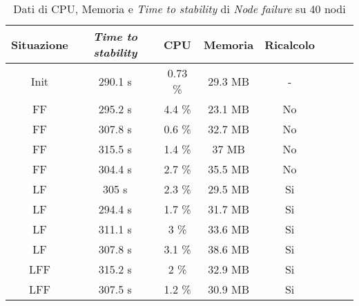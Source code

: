     \begin{table}[H]
    \caption{Dati di CPU, Memoria e \textit{Time to stability} di \textit{Node failure} su 40 nodi}
    \label{tab:NF40}
    \begin{center}
        \begin{tabular}{|c|c|c|c|c|c|c|c|}
            \hline
            Situazione & \textit{Time to stability} & CPU & Memoria & Ricalcolo\\
            \hline
            Init & 290.1 s & 0.73 \% & 29.3 MB & -\\
            FF    & 295.2 s  & 4.4 \%  & 23.1 MB & No\\
            FF    & 307.8 s  & 0.6 \%  & 32.7 MB & No\\
            FF    & 315.5 s  & 1.4 \%  & 37   MB & No\\
            FF    & 304.4 s  & 2.7 \%  & 35.5 MB & No\\
            LF    & 305 s    & 2.3 \%  & 29.5 MB & Si\\
            LF    & 294.4 s  & 1.7 \%  & 31.7 MB & Si\\
            LF    & 311.1 s  & 3   \%  & 33.6 MB & Si\\
            LF    & 307.8 s  & 3.1  \% & 38.6 MB & Si\\
            LFF    & 315.2 s  & 2   \%  & 32.9 MB & Si\\
            LFF   & 307.5 s  & 1.2 \%  & 30.9 MB & Si\\
            \hline
        \end{tabular}
        \end{center}
    \end{table}
    

